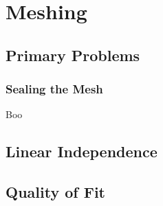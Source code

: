 % 

\section{Meshing}

\subsection{Primary Problems}
\begin{frame}\frametitle{Sealing the Mesh}
Boo
\end{frame}


\subsection{Linear Independence}
	
\subsection{Quality of Fit}

\endinput  %
